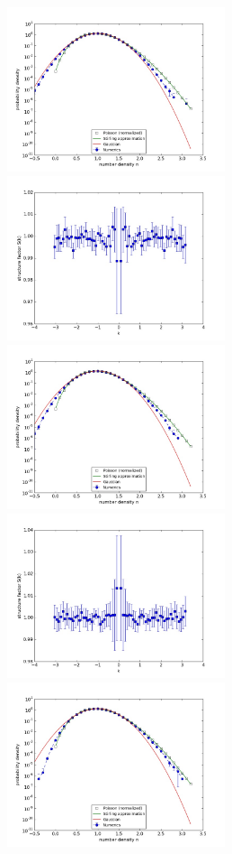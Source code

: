 \documentclass{article}
\begin{document}
\begin{figure}
\begin{center}
\end{center}
\includegraphics[width=0.5\linewidth,height=1.9in]{fig1/diff_dt2_hist_mid1.jpg}
\includegraphics[width=0.5\linewidth,height=1.9in]{fig1/diff_dt2_Sk_mid1.jpg}
\includegraphics[width=0.5\linewidth,height=1.9in]{fig1/diff_dt2_hist_mid2.jpg}
\includegraphics[width=0.5\linewidth,height=1.9in]{fig1/diff_dt2_Sk_mid2.jpg}
\includegraphics[width=0.5\linewidth,height=1.9in]{fig1/diff_dt2_hist_mid3.jpg}

\end{figure}
\end{document}
